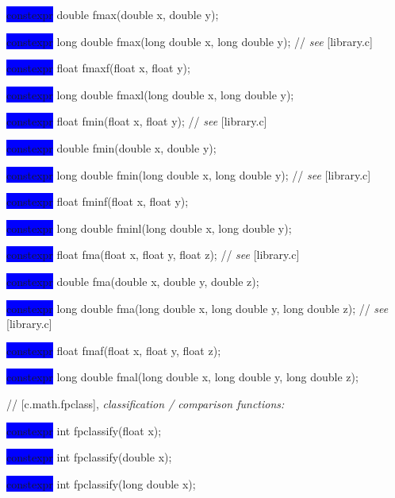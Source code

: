 \documentclass[prd,twocolumn,amsmath,amssymb,nofootinbib,eqsecnum]{revtex4-1}
\newcommand{\oldhighlight}[1]{\colorbox{blue}{\!\!\!\! #1}}
\newcommand{\stdcomment}[1]{{// {\it see} [#1]}}
\begin{document}
{\oldhighlight{constexpr}  double fmax(double x, double y);

\oldhighlight{constexpr}  long double fmax(long double x, long double y); \stdcomment{library.c}

\oldhighlight{constexpr}  float fmaxf(float x, float y);

\oldhighlight{constexpr}  long double fmaxl(long double x, long double y);

\vspace{2ex}


\oldhighlight{constexpr} float fmin(float x, float y); \stdcomment{library.c}

\oldhighlight{constexpr}  double fmin(double x, double y);

\oldhighlight{constexpr}  long double fmin(long double x, long double y); \stdcomment{library.c}

\oldhighlight{constexpr}  float fminf(float x, float y);

\oldhighlight{constexpr} long double fminl(long double x, long double y);

\vspace{2ex}


\oldhighlight{constexpr}  float fma(float x, float y, float z); \stdcomment{library.c}

\oldhighlight{constexpr}  double fma(double x, double y, double z);

\oldhighlight{constexpr}  long double fma(long double x, long double y, long double z); \stdcomment{library.c}

\oldhighlight{constexpr}  float fmaf(float x, float y, float z);

\oldhighlight{constexpr}  long double fmal(long double x, long double y, long double z);

\vspace{2ex}

// [c.math.fpclass], {\it classification / comparison functions:}


\oldhighlight{constexpr} int fpclassify(float x);

\oldhighlight{constexpr} int fpclassify(double x);

\oldhighlight{constexpr} int fpclassify(long double x);

\vspace{2ex}


}
\end{document}
